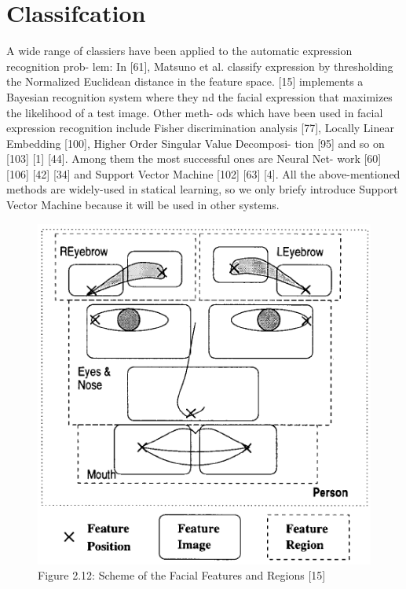 \documentclass[12pt, twoside]{report}
\begin{document}
\section{Classifcation}
\par
A wide range of classiers have been applied to the automatic expression recognition prob-
lem: In [61], Matsuno et al. classify expression by thresholding the Normalized Euclidean
distance in the feature space. [15] implements a Bayesian recognition system where they nd the facial expression that maximizes the likelihood of a test image. Other meth-
ods which have been used in facial expression recognition include Fisher discrimination
analysis [77], Locally Linear Embedding [100], Higher Order Singular Value Decomposi-
tion [95] and so on [103] [1] [44]. Among them the most successful ones are Neural Net-
work [60] [106] [42] [34] and Support Vector Machine [102] [63] [4]. All the above-mentioned
methods are widely-used in statical learning, so we only briefy introduce Support Vector
Machine because it will be used in other systems.

	\newpage

	\begin{figure}
		\centering \includegraphics[totalheight=8cm]{img/93_1.png}
		\caption{Figure 2.12: Scheme of the Facial Features and Regions [15]}
		\label{Fig 2.12}
	\end{figure}
\end{document}
